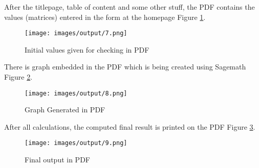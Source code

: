 After the titlepage, table of content and some other stuff, the PDF contains 
the values (matrices) entered in the form at the homepage Figure \ref{fig:6}.
\begin{figure}
\centering \texttt{[image: images/output/7.png]}
\caption{Initial values given for checking in PDF}
\label{fig:6}
\end{figure}

There is graph embedded in the PDF which is being created using Sagemath Figure \ref{fig:7}.
\begin{figure}
\centering \texttt{[image: images/output/8.png]}
\caption{Graph Generated in PDF}
\label{fig:7}
\end{figure}

After all calculations, the computed final result is printed on the PDF Figure \ref{fig:8}.
\begin{figure}
\centering \texttt{[image: images/output/9.png]}
\caption{Final output in PDF}
\label{fig:8}
\end{figure}
